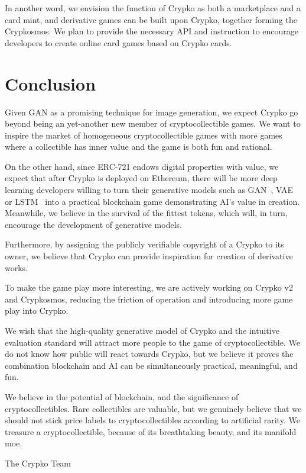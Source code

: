 \documentclass[b5paper]{article}
\begin{document}
In another word, we envision the function of Crypko as both a marketplace and a card mint, 
and derivative games can be built upon Crypko, together forming the Crypkosmos. 
We plan to provide the necessary API and instruction to encourage developers to create online card games based on Crypko cards.

\section{Conclusion}

Given GAN as a promising technique for image generation, we expect Crypko go beyond being an yet-another new member of cryptocollectible games. 
We want to inspire the market of homogeneous cryptocollectible games with more games where a collectible has inner value and the game is both fun and rational.

On the other hand, since ERC-721 endows digital properties with value, 
we expect that after Crypko is deployed on Ethereum, 
there will be more deep learning developers willing to turn their generative models such as GAN~\cite{goodfellow2014generative}, VAE~\cite{kingma2013auto} or LSTM~\cite{hochreiter1997long} 
into a practical blockchain game demonstrating AI's value in creation. 
Meanwhile, we believe in the survival of the fittest tokens, which will, in turn, encourage the development of generative models.

Furthermore, by assigning the publicly verifiable copyright of a Crypko to its owner, we believe that Crypko can provide inspiration for creation of derivative works.

To make the game play more interesting, we are actively working on Crypko v2 and Crypkosmos, reducing the friction of operation and introducing more game play into Crypko.

We wish that the high-quality generative model of Crypko and the intuitive evaluation standard will attract more people to the game of cryptocollectible. We do not know how public will react towards Crypko, but we believe it proves the combination blockchain and AI can be simultaneously practical, meaningful, and fun.

We believe in the potential of blockchain, and the significance of cryptocollectibles.
Rare collectibles are valuable, but we genuinely believe that we should not stick price labels to cryptocollectibles according to artificial rarity. We treasure a cryptocollectible, because of its breathtaking beauty, and its manifold moe.

\vspace{5mm}

\begin{flushright}
 The Crypko Team
\end{flushright}



\end{document}
